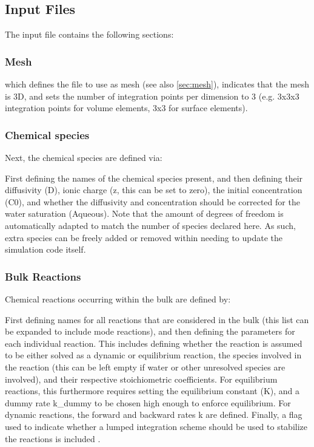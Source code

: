 \documentclass[3p]{elsarticle} %
\newcommand{\CodeSnipU}[4]{}
\begin{document}
\subsection{Input Files}
The input file contains the following sections:

\subsubsection{Mesh}
\CodeSnipU{TestCases/ElectroChemistry/Test_ElectroChem.json}{11}{15}{TestCases/ElectroChemistry/Test\_ElectroChem.json}
which defines the file to use as mesh (see also \cref{sec:mesh}), indicates that the mesh is 3D, and sets the number of integration points per dimension to 3 (e.g. 3x3x3 integration points for volume elements, 3x3 for surface elements). 

\subsubsection{Chemical species}
Next, the chemical species are defined via:
\CodeSnipU{TestCases/ElectroChemistry/Test_ElectroChem.json}{16}{25}{TestCases/ElectroChemistry/Test\_ElectroChem.json}
First defining the names of the chemical species present, and then defining their diffusivity (D), ionic charge (z, this can be set to zero), the initial concentration (C0), and whether the diffusivity and concentration should be corrected for the water saturation (Aqueous). Note that the amount of degrees of freedom is automatically adapted to match the number of species declared here. As such, extra species can be freely added or removed within needing to update the simulation code itself.

\subsubsection{Bulk Reactions}
Chemical reactions occurring within the bulk are defined by:
\CodeSnipU{TestCases/ElectroChemistry/Test_ElectroChem.json}{63}{85}{TestCases/ElectroChemistry/Test\_ElectroChem.json}
First defining names for all reactions that are considered in the bulk (this list can be expanded to include mode reactions), and then defining the parameters for each individual reaction. This includes defining whether the reaction is assumed to be either solved as a dynamic or equilibrium reaction, the species involved in the reaction (this can be left empty if water or other unresolved species are involved), and their respective stoichiometric coefficients. For equilibrium reactions, this furthermore requires setting the equilibrium constant (K), and a dummy rate k\_dummy to be chosen high enough to enforce equilibrium. For dynamic reactions, the forward and backward rates k are defined. Finally, a flag used to indicate whether a lumped integration scheme should be used to stabilize the reactions is included \citep{Hageman2023a}. 
\end{document}
